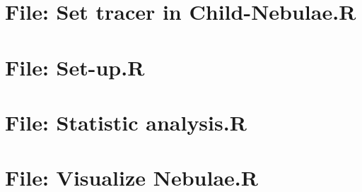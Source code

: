 \documentclass[
]{article}
\newenvironment{Shaded}{\begin{snugshade}}{\end{snugshade}}
\newcommand{\DecValTok}[1]{\textcolor[rgb]{0.00,0.00,0.81}{#1}}
\newcommand{\FloatTok}[1]{\textcolor[rgb]{0.00,0.00,0.81}{#1}}
\newcommand{\FunctionTok}[1]{\textcolor[rgb]{0.00,0.00,0.00}{#1}}
\newcommand{\NormalTok}[1]{#1}
\newcommand{\OtherTok}[1]{\textcolor[rgb]{0.56,0.35,0.01}{#1}}
\newcommand{\SpecialCharTok}[1]{\textcolor[rgb]{0.00,0.00,0.00}{#1}}
\newcommand{\StringTok}[1]{\textcolor[rgb]{0.31,0.60,0.02}{#1}}
\begin{document}
\hypertarget{file-set-tracer-in-child-nebulae.r}{%
\section{File: Set tracer in Child-Nebulae.R}\label{file-set-tracer-in-child-nebulae.r}}

\hypertarget{file-set-up.r}{%
\section{File: Set-up.R}\label{file-set-up.r}}

\begin{Shaded}
\end{Shaded}

\hypertarget{file-statistic-analysis.r}{%
\section{File: Statistic analysis.R}\label{file-statistic-analysis.r}}

\hypertarget{file-visualize-nebulae.r}{%
\section{File: Visualize Nebulae.R}\label{file-visualize-nebulae.r}}
\end{document}
